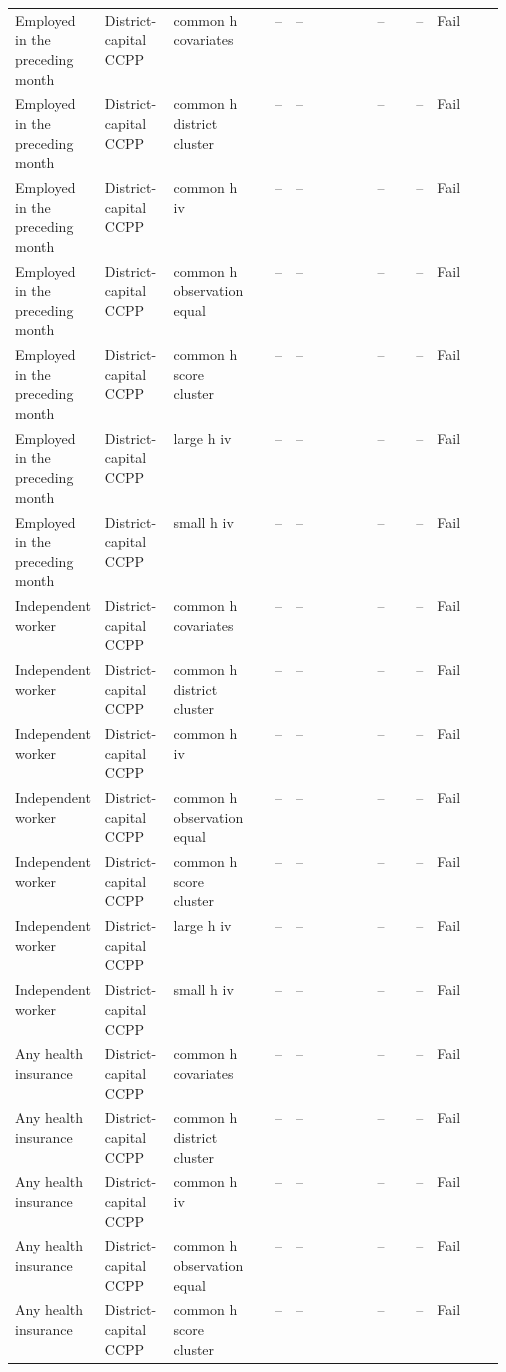 \begin{longtable}{@{}p{0.16\linewidth}p{0.14\linewidth}p{0.14\linewidth}rp{0.13\linewidth}rrl@{}}
Employed in the preceding month & District-capital CCPP & common h covariates & -- & -- & -- & -- & Fail \\
Employed in the preceding month & District-capital CCPP & common h district cluster & -- & -- & -- & -- & Fail \\
Employed in the preceding month & District-capital CCPP & common h iv & -- & -- & -- & -- & Fail \\
Employed in the preceding month & District-capital CCPP & common h observation equal & -- & -- & -- & -- & Fail \\
Employed in the preceding month & District-capital CCPP & common h score cluster & -- & -- & -- & -- & Fail \\
Employed in the preceding month & District-capital CCPP & large h iv & -- & -- & -- & -- & Fail \\
Employed in the preceding month & District-capital CCPP & small h iv & -- & -- & -- & -- & Fail \\
Independent worker & District-capital CCPP & common h covariates & -- & -- & -- & -- & Fail \\
Independent worker & District-capital CCPP & common h district cluster & -- & -- & -- & -- & Fail \\
Independent worker & District-capital CCPP & common h iv & -- & -- & -- & -- & Fail \\
Independent worker & District-capital CCPP & common h observation equal & -- & -- & -- & -- & Fail \\
Independent worker & District-capital CCPP & common h score cluster & -- & -- & -- & -- & Fail \\
Independent worker & District-capital CCPP & large h iv & -- & -- & -- & -- & Fail \\
Independent worker & District-capital CCPP & small h iv & -- & -- & -- & -- & Fail \\
Any health insurance & District-capital CCPP & common h covariates & -- & -- & -- & -- & Fail \\
Any health insurance & District-capital CCPP & common h district cluster & -- & -- & -- & -- & Fail \\
Any health insurance & District-capital CCPP & common h iv & -- & -- & -- & -- & Fail \\
Any health insurance & District-capital CCPP & common h observation equal & -- & -- & -- & -- & Fail \\
Any health insurance & District-capital CCPP & common h score cluster & -- & -- & -- & -- & Fail \\

\end{longtable}
